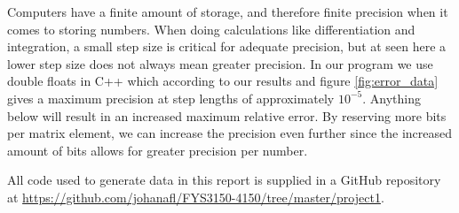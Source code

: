 \documentclass{emulateapj}
\begin{document}
    Computers have a finite amount of storage, and therefore finite precision when it comes to storing numbers. When doing calculations like differentiation and integration, a small step size is critical for adequate precision, but at seen here a lower step size does not always mean greater precision. In our program we use double floats in C++ which according to our results and figure \ref{fig:error_data} gives a maximum precision at step lengths of approximately $10^{-5}$. Anything below will result in an increased maximum relative error. By reserving more bits per matrix element, we can increase the precision even further since the increased amount of bits allows for greater precision per number.
    
    All code used to generate data in this report is supplied in a GitHub repository at \url{https://github.com/johanafl/FYS3150-4150/tree/master/project1}.
    
    
    
    
    
    









%
\end{document}

